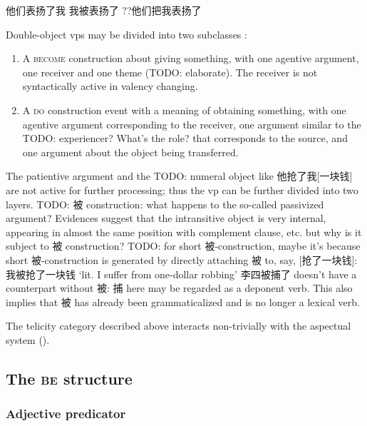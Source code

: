 \documentclass[UTF8, a4paper, oneside, scheme=plain, 12pt]{ctexrep}
\newcommand*{\citesec}[1]{\S~{#1}}
\newcommand{\translate}[1]{`#1'}
\newcommand*{\category}[1]{\textsc{#1}}
\begin{document}
\begin{exe}
    \ex 他们表扬了我
    \ex 我被表扬了
    \ex ??他们把我表扬了
\end{exe}


Double-object \acs{vp}s may be divided into 
two subclasses
\citep[\citesec{7.2}]{deng2010formal}:
\begin{enumerate}
    \item A \category{become} construction about giving something,
        with one agentive argument, 
        one receiver and one theme (TODO: elaborate).
        The receiver is not syntactically active 
        in valency changing. 
    \item A \category{do} construction event with a meaning of obtaining something,
        with one agentive argument corresponding to the receiver, 
        one argument similar to the TODO: experiencer? What's the role? that corresponds to the source, 
        and one argument about the object being transferred.
\end{enumerate}

The patientive argument and the TODO: numeral object like 他抢了我[一块钱] 
are not active for further processing; 
thus the \acs{vp} can be further divided into two layers.
TODO: 被 construction: what happens to the so-called passivized argument?
Evidences suggest that the intransitive object is very internal, 
appearing in almost the same position with complement clause, etc.
but why is it subject to 被 construction? 
TODO: for short 被-construction, 
maybe it's because short 被-construction is generated by directly attaching 被 to, say, [抢了一块钱]: 
我被抢了一块钱 \translate{lit. I suffer from one-dollar robbing}
李四被捕了 doesn't have a counterpart without 被: 
捕 here may be regarded as a deponent verb. 
This also implies that 被 has already been grammaticalized 
and is no longer a lexical verb.


The telicity category described above interacts non-trivially with 
the aspectual system ().

\subsection{The \category{be} structure}\label{sec:verb-phrase.be}

\subsubsection{Adjective predicator}
\end{document}
